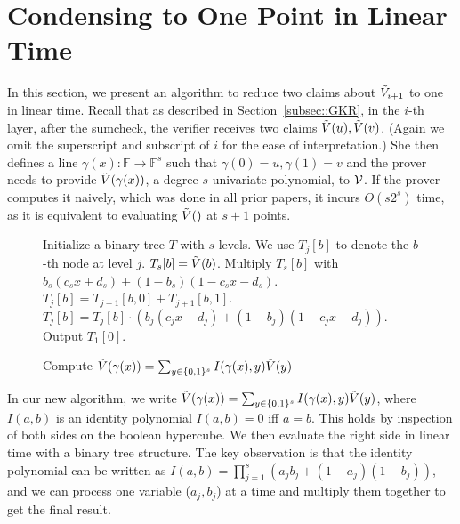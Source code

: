 \section{Condensing to One Point in Linear Time}\label{app:onepoint}


In this section, we present an algorithm to reduce two claims about $\tilde{V}_{i+1}$ to one in linear time. Recall that as described in Section~\ref{subsec::GKR}, in the $i$-th layer, after the sumcheck, the verifier receives two claims $\tilde{V}(u), \tilde{V}(v)$. (Again we omit the superscript and subscript of $i$ for the ease of interpretation.) She then defines a line $\gamma(x): \mathbb{F}\rightarrow\mathbb{F}^{s}$ such that $\gamma(0) = u, \gamma(1)=v$ and the prover needs to provide $\tilde{V}(\gamma(x))$, a degree $s$ univariate polynomial, to $\mathcal{V}$. If the prover computes it naively, which was done in all prior papers, it incurs $O(s2^{s})$ time, as it is equivalent to evaluating $\tilde{V}()$ at $s+1$ points. 

\begin{figure}[H]
	\begin{algorithm}[H]
		
		\caption{Compute $\tilde{V}(\gamma(x)) = \sum_{y\in\{0,1\}^s}I(\gamma(x), y)\tilde{V}(y)$}\label{alg::comb}
		\begin{algorithmic}[1]
			\State Initialize a binary tree $T$ with $s$ levels. We use $T_j[b]$ to denote the $b$-th node at level $j$.
				\State $T_s[b] = \tilde{V}(b)$.
				\State Multiply $T_s[b]$ with $b_s(c_s x+ d_s)+(1-b_s)(1-c_s x- d_s)$.
			\EndFor
					\State $T_j[b] = T_{j+1}[b,0]+T_{j+1}[b,1]$.
					\State $T_j[b] = T_j[b] \cdot (b_j(c_j x+ d_j)+(1-b_j)(1-c_j x- d_j))$. 
				\EndFor
			\EndFor
			\State Output $T_1[0]$.
		\end{algorithmic}
	\end{algorithm}
\end{figure}


In our new algorithm, we write $\tilde{V}(\gamma(x)) = \sum_{y\in\{0,1\}^s}I(\gamma(x), y)\tilde{V}(y)$, where $I(a,b)$ is an identity polynomial $I(a,b)=0$ iff $a=b$. This holds by inspection of both sides on the boolean hypercube. We then evaluate the right side in linear time with a binary tree structure. The key observation is that the identity polynomial can be written as $I(a,b) = \prod_{j=1}^s (a_jb_j+(1-a_j)(1-b_j))$, and we can process one variable ($a_j,b_j$) at a time and multiply them together to get the final result. 

